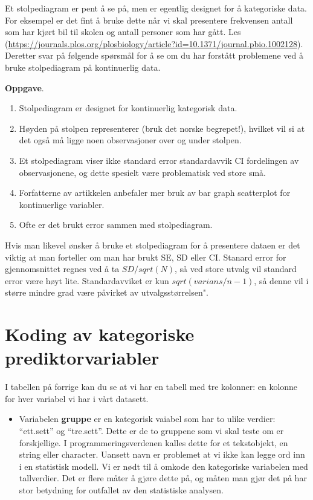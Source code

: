 \documentclass[
]{book}
\providecommand{\tightlist}{%
  \setlength{\itemsep}{0pt}\setlength{\parskip}{0pt}}
\begin{document}
Et stolpediagram er pent å se på, men er egentlig designet for å kategoriske data. For eksempel er det fint å bruke dette når vi skal presentere frekvensen antall som har kjørt bil til skolen og antall personer som har gått. Les \citep{weissgerber_beyond_2015}(\url{https://journals.plos.org/plosbiology/article?id=10.1371/journal.pbio.1002128}). Deretter svar på følgende spørsmål for å se om du har forstått problemene ved å bruke stolpediagram på kontinuerlig data.

\textbf{Oppgave}.

\begin{enumerate}
\def\labelenumi{\alph{enumi}.}
\item
  Stolpediagram er designet for kontinuerlig kategorisk data.
\item
  Høyden på stolpen representerer (bruk det norske begrepet!), hvilket vil si at det også må ligge noen observasjoner over og under stolpen.
\item
  Et stolpediagram viser ikke standard error standardavvik CI fordelingen av observasjonene, og dette spesielt være problematisk ved store små.
\item
  Forfatterne av artikkelen anbefaler mer bruk av bar graph scatterplot for kontinuerlige variabler.
\item
  Ofte er det brukt error sammen med stolpediagram.
\end{enumerate}

Hvis man likevel ønsker å bruke et stolpediagram for å presentere dataen er det viktig at man forteller om man har brukt SE, SD eller CI. Stanard error for gjennomsnittet regnes ved å ta \(SD/sqrt(N)\), så ved store utvalg vil standard error være høyt lite. Standardavviket er kun \(sqrt(varians/n-1)\), så denne vil i større mindre grad være påvirket av utvalgsstørrelsen".

\hypertarget{koding-av-kategoriske-prediktorvariabler}{%
\chapter{Koding av kategoriske prediktorvariabler}\label{koding-av-kategoriske-prediktorvariabler}}

I tabellen på forrige kan du se at vi har en tabell med tre kolonner: en kolonne for hver variabel vi har i vårt datasett.

\begin{itemize}
\tightlist
\item
  Variabelen \textbf{gruppe} er en kategorisk vaiabel som har to ulike verdier: ``ett.sett'' og ``tre.sett''. Dette er de to gruppene som vi skal teste om er forskjellige. I programmeringsverdenen kalles dette for et tekstobjekt, en string eller character. Uansett navn er problemet at vi ikke kan legge ord inn i en statistisk modell. Vi er nødt til å omkode den kategoriske variabelen med tallverdier. Det er flere måter å gjøre dette på, og måten man gjør det på har stor betydning for outfallet av den statistiske analysen.
\end{itemize}
\end{document}
